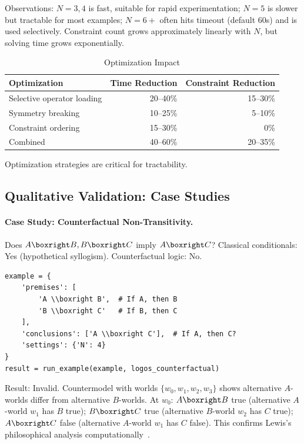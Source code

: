 \documentclass[pdflatex,sn-mathphys-num]{sn-jnl}
\theoremstyle{thmstyleone}
\theoremstyle{thmstyletwo}
\theoremstyle{thmstylethree}
\begin{document}
Observations: $N=3,4$ is fast, suitable for rapid experimentation; $N=5$ is slower but tractable for most examples; $N=6+$ often hits timeout (default 60s) and is used selectively.
Constraint count grows approximately linearly with $N$, but solving time grows exponentially.

\begin{table}[htbp]
\centering
\caption{Optimization Impact}
\label{tab:optimization}
\begin{tabular}{@{}lrr@{}}
\toprule
\textbf{Optimization} & \textbf{Time Reduction} & \textbf{Constraint Reduction} \\
\midrule
Selective operator loading & 20--40\% & 15--30\% \\
Symmetry breaking & 10--25\% & 5--10\% \\
Constraint ordering & 15--30\% & 0\% \\
Combined & 40--60\% & 20--35\% \\
\bottomrule
\end{tabular}
\end{table}

Optimization strategies are critical for tractability.

\subsection{Qualitative Validation: Case Studies}\label{sec:case-studies}

\paragraph{Case Study: Counterfactual Non-Transitivity.}
Does $A \boxright B, B \boxright C$ imply $A \boxright C$?
Classical conditionals: Yes (hypothetical syllogism).
Counterfactual logic: No.

\begin{lstlisting}[caption={Testing counterfactual transitivity}]
example = {
    'premises': [
        'A \\boxright B',  # If A, then B
        'B \\boxright C'   # If B, then C
    ],
    'conclusions': ['A \\boxright C'],  # If A, then C?
    'settings': {'N': 4}
}
result = run_example(example, logos_counterfactual)
\end{lstlisting}

Result: Invalid.
Countermodel with worlds $\{w_0, w_1, w_2, w_3\}$ shows alternative $A$-worlds differ from alternative $B$-worlds.
At $w_0$: $A \boxright B$ true (alternative $A$-world $w_1$ has $B$ true); $B \boxright C$ true (alternative $B$-world $w_2$ has $C$ true); $A \boxright C$ false (alternative $A$-world $w_1$ has $C$ false).
This confirms Lewis's philosophical analysis computationally~\cite{lewis1973}.
\end{document}
